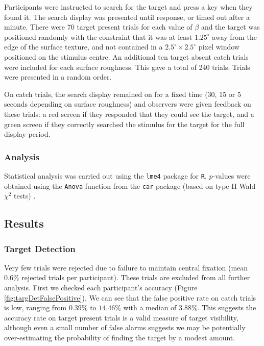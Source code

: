 \documentclass[man]{apa6}
\begin{document}
Participants were instructed to search for the target and press a key when they found it. The search display was presented until response, or timed out after a minute. There were 70 target present trials for each value of $\beta$ and the target was positioned randomly with the constraint that it was at least $1.25^{\circ}$ away from the edge of the surface texture, and not contained in a $2.5^{\circ}\times2.5^{\circ}$ pixel window positioned on the stimulus centre. An additional ten target absent catch trials were included for each surface roughness. This gave a total of 240 trials. Trials were presented in a random order. 
\par
On catch trials, the search display remained on for a fixed time (30, 15 or 5 seconds depending on surface roughness) and observers were given feedback on these trials: a red screen if they responded that they could see the target, and a green screen if they correctly searched the stimulus for the target for the full display period. %

\subsubsection{Analysis}

Statistical analysis was carried out using the \texttt{lme4} \parencite{bates2013lme4} package for \texttt{R}. $p$-values were obtained using the \texttt{Anova} function from the \texttt{car} package (based on type II Wald $\chi^2$ tests) \parencite{fox2010}.

\subsection{Results}

\subsubsection{Target Detection}
\label{sec:targDet}
Very few trials were rejected due to failure to maintain central fixation (mean $0.6\%$ rejected trials per participant). These trials are excluded from all further analysis. First we checked each participant's accuracy (Figure \ref{fig:targDetFalsePositive}). We can see that the false positive rate on catch trials is low, ranging from $0.39\%$ to $14.46\%$ with a median of $3.88\%$. This suggests the accuracy rate on target present trials is a valid measure of target visibility, although even a small number of false alarms suggests we may be potentially over-estimating the probability of finding the target by a modest amount. 
\end{document}
